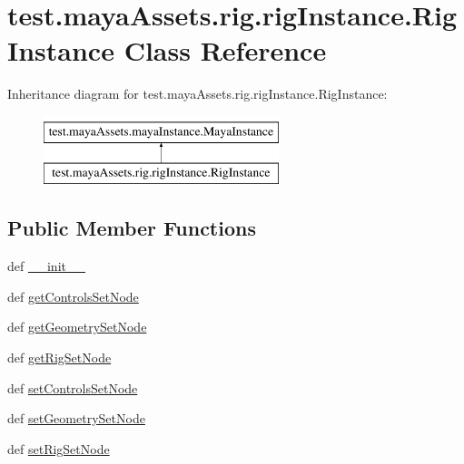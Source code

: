 \hypertarget{classtest_1_1mayaAssets_1_1rig_1_1rigInstance_1_1RigInstance}{\section{test.\-maya\-Assets.\-rig.\-rig\-Instance.\-Rig\-Instance \-Class \-Reference}
\label{d6/da0/classtest_1_1mayaAssets_1_1rig_1_1rigInstance_1_1RigInstance}
}
\-Inheritance diagram for test.\-maya\-Assets.\-rig.\-rig\-Instance.\-Rig\-Instance\-:\begin{figure}[H]
\begin{center}
\leavevmode
\includegraphics[height=2.000000cm]{d6/da0/classtest_1_1mayaAssets_1_1rig_1_1rigInstance_1_1RigInstance}
\end{center}
\end{figure}
\subsection*{\-Public \-Member \-Functions}
\begin{DoxyCompactItemize}
\item 
def \hyperlink{classtest_1_1mayaAssets_1_1rig_1_1rigInstance_1_1RigInstance_a98f7229a414fb8c3f6844ce8bb3f97f1}{\-\_\-\-\_\-init\-\_\-\-\_\-}
\item 
def \hyperlink{classtest_1_1mayaAssets_1_1rig_1_1rigInstance_1_1RigInstance_a15b07d233b66be50b0d798c87b1cf22a}{get\-Controls\-Set\-Node}
\item 
def \hyperlink{classtest_1_1mayaAssets_1_1rig_1_1rigInstance_1_1RigInstance_a4cba750467308fdfbb38df8385a49e71}{get\-Geometry\-Set\-Node}
\item 
def \hyperlink{classtest_1_1mayaAssets_1_1rig_1_1rigInstance_1_1RigInstance_ab6687aebf7d00980d4afdd9e6661167a}{get\-Rig\-Set\-Node}
\item 
def \hyperlink{classtest_1_1mayaAssets_1_1rig_1_1rigInstance_1_1RigInstance_a3a843778091b11d2521b9339d58a4bd2}{set\-Controls\-Set\-Node}
\item 
def \hyperlink{classtest_1_1mayaAssets_1_1rig_1_1rigInstance_1_1RigInstance_aaf326280e960d773d8b78f787462c4c5}{set\-Geometry\-Set\-Node}
\item 
def \hyperlink{classtest_1_1mayaAssets_1_1rig_1_1rigInstance_1_1RigInstance_ac2b15f6a09596fc9d41ca68f446ddeda}{set\-Rig\-Set\-Node}
\end{DoxyCompactItemize}


